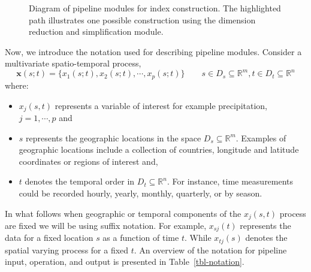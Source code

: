 \documentclass[
]{interact}
\begin{document}
\begin{figure}


\caption{\label{fig-pipeline-steps}Diagram of pipeline modules for index
construction. The highlighted path illustrates one possible construction
using the dimension reduction and simplification module.}

\end{figure}%

Now, we introduce the notation used for describing pipeline modules.
Consider a multivariate spatio-temporal process,
\[\mathbf{x}(s;t) = \{x_1(s;t), x_2(s;t), \cdots, x_p(s;t)\} \qquad s \in D_s \subseteq \mathbb{R}^m, t \in D_t \subseteq \mathbb{R}^n \]
where:

\begin{itemize}
\item
  \(x_j(s, t)\) represents a variable of interest for example
  precipitation, \(j = 1, \cdots, p\) and
\item
  \(s\) represents the geographic locations in the space
  \(D_s \subseteq \mathbb{R}^m\). Examples of geographic locations
  include a collection of countries, longitude and latitude coordinates
  or regions of interest and,
\item
  \(t\) denotes the temporal order in \(D_t \subseteq \mathbb{R}^n\).
  For instance, time measurements could be recorded hourly, yearly,
  monthly, quarterly, or by season.
\end{itemize}

In what follows when geographic or temporal components of the
\(x_j(s,t)\) process are fixed we will be using suffix notation. For
example, \(x_{sj}(t)\) represents the data for a fixed location \(s\) as
a function of time \(t\). While \(x_{tj}(s)\) denotes the spatial
varying process for a fixed \(t\). An overview of the notation for
pipeline input, operation, and output is presented in
Table~\ref{tbl-notation}.
\end{document}
